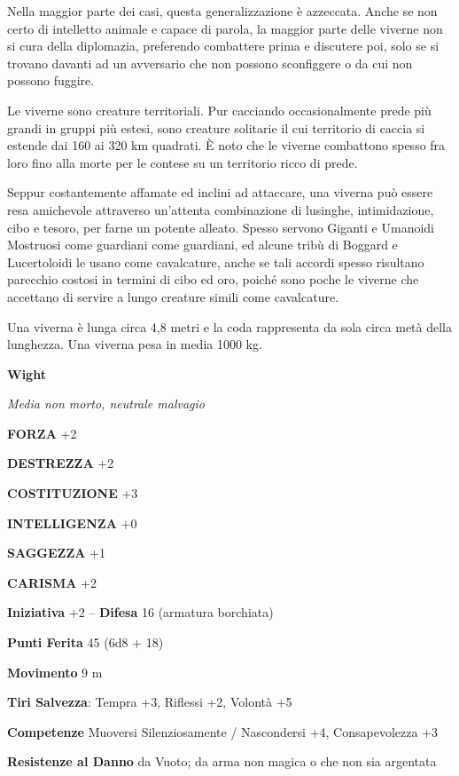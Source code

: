 \begin{multicols}{2}
Nella maggior parte dei casi, questa generalizzazione è azzeccata. Anche se non certo di intelletto animale e capace di parola, la maggior parte delle viverne non si cura della diplomazia, preferendo combattere prima e discutere poi, solo se si trovano davanti ad un avversario che non possono sconfiggere o da cui non possono fuggire.

Le viverne sono creature territoriali. Pur cacciando occasionalmente prede più grandi in gruppi più estesi, sono creature solitarie il cui territorio di caccia si estende dai 160 ai 320 km quadrati. È noto che le viverne combattono spesso fra loro fino alla morte per le contese su un territorio ricco di prede.

Seppur costantemente affamate ed inclini ad attaccare, una viverna può essere resa amichevole attraverso un'attenta combinazione di lusinghe, intimidazione, cibo e tesoro, per farne un potente alleato. Spesso servono Giganti e Umanoidi Mostruosi come guardiani come guardiani, ed alcune tribù di Boggard e Lucertoloidi le usano come cavalcature, anche se tali accordi spesso risultano parecchio costosi in termini di cibo ed oro, poiché sono poche le viverne che accettano di servire a lungo creature simili come cavalcature.

Una viverna è lunga circa 4,8 metri e la coda rappresenta da sola circa metà della lunghezza. Una viverna pesa in media 1000 kg.


\medskip{}\textbf{Wight}

\textit{Media non morto, neutrale malvagio}

\textbf{FORZA} +2

\textbf{DESTREZZA} +2

\textbf{COSTITUZIONE} +3

\textbf{INTELLIGENZA} +0

\textbf{SAGGEZZA} +1

\textbf{CARISMA} +2

\textbf{Iniziativa} +2 -- \textbf{Difesa} 16 (armatura borchiata)

\textbf{Punti Ferita} 45 (6d8 + 18)

\textbf{Movimento} 9 m

\textbf{Tiri Salvezza}: Tempra +3, Riflessi +2, Volontà +5

\textbf{Competenze} Muoversi Silenziosamente / Nascondersi +4, Consapevolezza +3

\textbf{Resistenze al Danno} da Vuoto; da arma non magica o che non sia argentata


\end{multicols}
